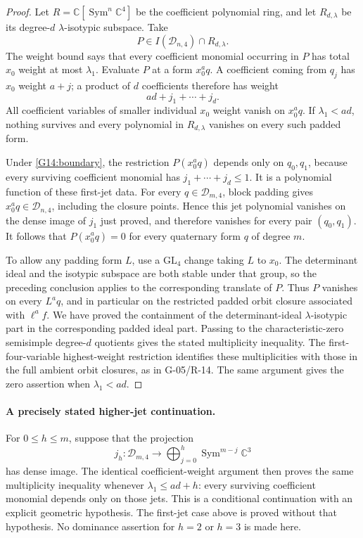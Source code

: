 \documentclass[11pt,a4paper]{article}
\theoremstyle{definition}\newtheorem{definition}{Definition}
\begin{document}
\begin{proof}
Let $R=\mathbb C[\operatorname{Sym}^n\mathbb C^4]$ be
the coefficient polynomial ring, and let $R_{d,\lambda}$
be its degree-$d$ $\lambda$-isotypic subspace. Take
\[
 P\in I(\mathcal D_{n,4})\cap R_{d,\lambda}.
\]
The weight bound says that every coefficient monomial
occurring in $P$ has total $x_0$ weight at most
$\lambda_1$. Evaluate $P$ at a form $x_0^a q$. A
coefficient coming from $q_j$ has $x_0$ weight $a+j$;
a product of $d$ coefficients therefore has weight
\[
 ad+j_1+\cdots+j_d.
\]
All coefficient variables of smaller individual $x_0$
weight vanish on $x_0^a q$. If $\lambda_1<ad$, nothing
survives and every polynomial in $R_{d,\lambda}$ vanishes
on every such padded form.

Under \eqref{G14:boundary}, the restriction
$P(x_0^a q)$ depends only on $q_0,q_1$, because every
surviving coefficient monomial has
$j_1+\cdots+j_d\leq1$. It is a polynomial function of
these first-jet data. For every $q\in\mathcal D_{m,4}$,
block padding gives $x_0^a q\in\mathcal D_{n,4}$,
including the closure points. Hence this jet polynomial
vanishes on the dense image of $j_1$ just proved, and
therefore vanishes for every pair $(q_0,q_1)$. It follows
that $P(x_0^a q)=0$ for every quaternary form $q$ of
degree $m$.

To allow any padding form $L$, use a $\mathrm{GL}_4$
change taking $L$ to $x_0$. The determinant ideal and
the isotypic subspace are both stable under that group,
so the preceding conclusion applies to the corresponding
translate of $P$. Thus $P$ vanishes on every $L^a q$,
and in particular on the restricted padded orbit closure
associated with $\ell^a f$.
We have proved the containment of the determinant-ideal
$\lambda$-isotypic part in the corresponding padded ideal
part. Passing to the characteristic-zero semisimple
degree-$d$ quotients gives the stated multiplicity
inequality. The first-four-variable highest-weight
restriction identifies these multiplicities with those
in the full ambient orbit closures, as in G-05/R-14.
The same argument gives the zero assertion when
$\lambda_1<ad$.
\end{proof}

\paragraph{A precisely stated higher-jet continuation.}
For $0\leq h\leq m$, suppose that the projection
\[
 j_h:\mathcal D_{m,4}\longrightarrow
   \bigoplus_{j=0}^h\operatorname{Sym}^{m-j}\mathbb C^3
\]
has dense image. The identical coefficient-weight argument
then proves the same multiplicity inequality whenever
$\lambda_1\leq ad+h$: every surviving coefficient
monomial depends only on those jets. This is a conditional
continuation with an explicit geometric hypothesis.
The first-jet case above is proved without that hypothesis.
No dominance assertion for $h=2$ or $h=3$ is made here.
\end{document}
